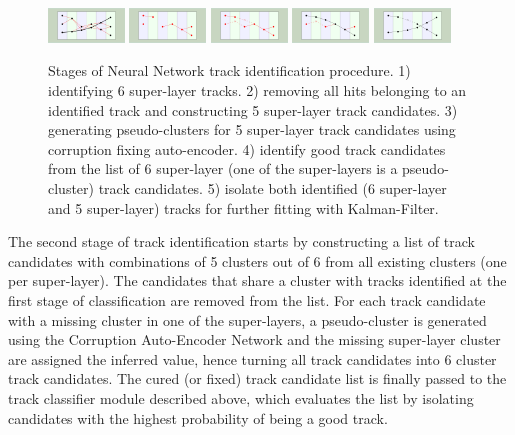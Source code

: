 \documentclass{webofc}
\begin{document}
 \begin{figure}[!h]
\begin{center}
 \includegraphics[angle=90,width=0.8in]{images/iden_6_sl.pdf}
  \includegraphics[angle=90,width=0.8in]{images/iden_5_sl_a.pdf}
    \includegraphics[angle=90,width=0.8in]{images/iden_5_sl_b.pdf}
      \includegraphics[angle=90,width=0.8in]{images/iden_5_sl_c.pdf}
            \includegraphics[angle=90,width=0.8in]{images/iden_5_sl_d.pdf}
            
\caption {Stages of Neural Network track identification procedure. 1) identifying 6 super-layer tracks. 2) 
removing all hits belonging to an identified track and constructing 5 super-layer track candidates. 
3) generating pseudo-clusters for 5 super-layer track candidates using corruption fixing auto-encoder. 
4) identify good track candidates from the list of 6 super-layer (one of the super-layers is a pseudo-cluster) 
track candidates. 5) isolate both identified (6 super-layer and 5 super-layer) tracks  for further fitting with 
Kalman-Filter.}
 \label{network:procedure}
 \end{center}
\end{figure}

The second stage of track identification starts by constructing a list of track candidates with combinations 
of 5 clusters out of 6 from all existing clusters (one per super-layer). The candidates that share a cluster with 
tracks identified at the first stage of classification are removed from the list. For each track candidate with a 
missing cluster in one of the super-layers, a pseudo-cluster is generated using the Corruption Auto-Encoder 
Network and the missing super-layer cluster are assigned the inferred value, hence turning all track candidates 
into 6 cluster track candidates. The cured (or fixed) track candidate list is finally passed to the track classifier 
module described above, which evaluates the list by isolating candidates with the highest probability of being a 
good track. 
\end{document}
